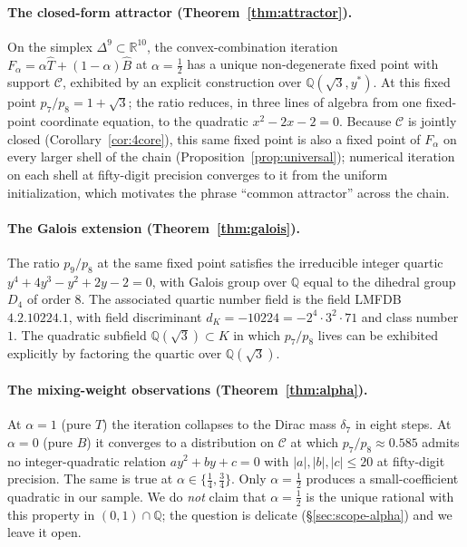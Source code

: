 \documentclass[11pt,reqno]{amsart}
\theoremstyle{plain}
\theoremstyle{definition}
\theoremstyle{remark}
\newcommand{\Q}{\mathbb{Q}}
\newcommand{\R}{\mathbb{R}}
\newcommand{\Cfour}{\mathcal{C}}
\newcommand{\Tfuse}{\widehat{T}}
\newcommand{\Bfuse}{\widehat{B}}
\newcommand{\Fmix}{F_{\alpha}}
\newcommand{\Simp}{\Delta^{9}}
\begin{document}
\paragraph{The closed-form attractor (Theorem~\ref{thm:attractor}).}
On the simplex $\Simp\subset\R^{10}$, the convex-combination
iteration $\Fmix=\alpha\Tfuse+(1-\alpha)\Bfuse$ at
$\alpha=\tfrac12$ has a unique non-degenerate fixed point with
support $\Cfour$, exhibited by an explicit construction over
$\Q(\sqrt{3},y^{*})$. At this fixed point $p_{7}/p_{8}=1+\sqrt{3}$;
the ratio reduces, in three lines of algebra from one fixed-point
coordinate equation, to the quadratic $x^{2}-2x-2=0$. Because
$\Cfour$ is jointly closed (Corollary~\ref{cor:4core}), this same
fixed point is also a fixed point of $\Fmix$ on every larger
shell of the chain (Proposition~\ref{prop:universal}); numerical
iteration on each shell at fifty-digit precision converges to it
from the uniform initialization, which motivates the phrase
``common attractor'' across the chain.

\paragraph{The Galois extension (Theorem~\ref{thm:galois}).} The
ratio $p_{9}/p_{8}$ at the same fixed point satisfies the
irreducible integer quartic $y^{4}+4y^{3}-y^{2}+2y-2=0$, with
Galois group over $\Q$ equal to the dihedral group $D_{4}$ of
order $8$. The associated quartic number field is the field LMFDB
\textnumero $4.2.10224.1$, with field discriminant
$d_{K}=-10224=-2^{4}\cdot 3^{2}\cdot 71$ and class number $1$. The
quadratic subfield $\Q(\sqrt{3})\subset K$ in which $p_{7}/p_{8}$
lives can be exhibited explicitly by factoring the quartic over
$\Q(\sqrt{3})$.

\paragraph{The mixing-weight observations (Theorem~\ref{thm:alpha}).}
At $\alpha=1$ (pure $T$) the iteration collapses to the Dirac mass
$\delta_{7}$ in eight steps. At $\alpha=0$ (pure $B$) it
converges to a distribution on $\Cfour$ at which
$p_{7}/p_{8}\approx 0.585$ admits no integer-quadratic relation
$ay^{2}+by+c=0$ with $|a|,|b|,|c|\leq 20$ at fifty-digit
precision. The same is true at $\alpha\in\{\tfrac14,\tfrac34\}$.
Only $\alpha=\tfrac12$ produces a small-coefficient quadratic in
our sample. We do \emph{not} claim that $\alpha=\tfrac12$ is the
unique rational with this property in $(0,1)\cap\Q$; the question
is delicate (\S\ref{sec:scope-alpha}) and we leave it open.
\end{document}
